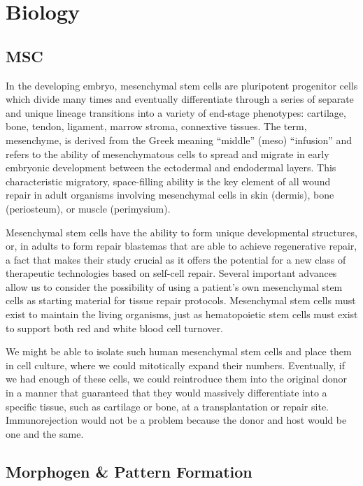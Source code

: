 \documentclass{article}
\begin{document}
\section{Biology}

\subsection{MSC}

In the developing embryo, mesenchymal stem cells are pluripotent progenitor cells which divide many times and eventually differentiate through a series of separate and unique lineage transitions into a variety of end-stage phenotypes: cartilage, bone, tendon, ligament, marrow stroma, connextive tissues.
The term, mesenchyme, is derived from the Greek meaning “middle” (meso) “infusion” and refers to the ability of mesenchymatous cells to spread and migrate in early embryonic development between the ectodermal and endodermal layers.
This characteristic migratory, space-filling ability is the key element of all wound repair in adult organisms involving mesenchymal cells in skin (dermis), bone (periosteum), or muscle (perimysium).

Mesenchymal stem cells have the ability to form unique developmental structures, or, in adults to form repair blastemas that are able to achieve regenerative repair, a fact that makes their study crucial as it offers the potential for a new class of therapeutic technologies based on self-cell repair. 
Several important advances allow us to consider the possibility of using a patient’s own mesenchymal stem cells as starting material for tissue repair protocols.
Mesenchymal stem cells must exist to maintain the living organisms, just as hematopoietic stem cells must exist to support both red and white blood cell turnover. 

We might be able to isolate such human mesenchymal stem cells and place them in cell culture, where we could mitotically expand their numbers. Eventually, if we had enough of these cells, we could reintroduce them into the original donor in a manner that guaranteed that they would massively differentiate into a specific tissue, such as cartilage or bone, at a transplantation or repair site. Immunorejection would not be a problem because the donor and host would be one and the same.


\subsection{Morphogen \& Pattern Formation}
\end{document}
